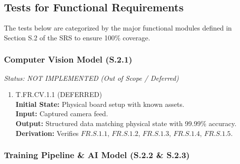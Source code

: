 \documentclass[12pt, titlepage]{article}
\begin{document}
\subsection{Tests for Functional Requirements}

The tests below are categorized by the major functional modules defined in Section S.2 of the SRS to ensure 100\% coverage.

\subsubsection{Computer Vision Model (S.2.1)}
\textit{Status: NOT IMPLEMENTED (Out of Scope / Deferred)}

\begin{enumerate}
    \item{\hypertarget{T.FR.CV.1.1}{T.FR.CV.1.1} (DEFERRED)\\}
    \textbf{Initial State:} Physical board setup with known assets.\\
    \textbf{Input:} Captured camera feed.\\
    \textbf{Output:} Structured data matching physical state with 99.99\% accuracy.\\
    \textbf{Derivation:} Verifies $\hyperref[FR.S.1.1]{FR.S.1.1}$, $\hyperref[FR.S.1.2]{FR.S.1.2}$, $\hyperref[FR.S.1.3]{FR.S.1.3}$, $\hyperref[FR.S.1.4]{FR.S.1.4}$, $\hyperref[FR.S.1.5]{FR.S.1.5}$.
\end{enumerate}

\subsubsection{Training Pipeline \& AI Model (S.2.2 \& S.2.3)}
\end{document}
